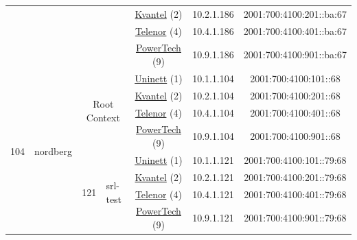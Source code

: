 \begin{small}
\begin{center}
\begin{longtable}{|c|c|c|c|c|c|c|c|}
  &  &  &  & \multicolumn{2}{|c|}{\tiny{\href{http://kvantel.no}{Kvantel} (2)}} & \tiny{10.2.1.186} & \tiny{2001:700:4100:201::ba:67} \\* \cline{5-5}\cline{6-6}\cline{7-7}\cline{8-8}
  &  &  &  & \multicolumn{2}{|c|}{\tiny{\href{https://www.telenor.no}{Telenor} (4)}} & \tiny{10.4.1.186} & \tiny{2001:700:4100:401::ba:67} \\* \cline{5-5}\cline{6-6}\cline{7-7}\cline{8-8}
  &  &  &  & \multicolumn{2}{|c|}{\tiny{\href{http://www.powertech.no}{PowerTech} (9)}} & \tiny{10.9.1.186} & \tiny{2001:700:4100:901::ba:67} \\ \hline
 \multirow{36}{*}{\tiny{104}} & \multicolumn{1}{|l|}{\multirow{36}{*}{\tiny{nordberg}}} & \multicolumn{2}{|c|}{\multirow{4}{*}{\tiny{Root Context}}} & \multicolumn{2}{|c|}{\tiny{\href{https://www.uninett.no}{Uninett} (1)}} & \tiny{10.1.1.104} & \tiny{2001:700:4100:101::68} \\* \cline{5-5}\cline{6-6}\cline{7-7}\cline{8-8}
  &  & \multicolumn{2}{|c|}{} & \multicolumn{2}{|c|}{\tiny{\href{http://kvantel.no}{Kvantel} (2)}} & \tiny{10.2.1.104} & \tiny{2001:700:4100:201::68} \\* \cline{5-5}\cline{6-6}\cline{7-7}\cline{8-8}
  &  & \multicolumn{2}{|c|}{} & \multicolumn{2}{|c|}{\tiny{\href{https://www.telenor.no}{Telenor} (4)}} & \tiny{10.4.1.104} & \tiny{2001:700:4100:401::68} \\* \cline{5-5}\cline{6-6}\cline{7-7}\cline{8-8}
  &  & \multicolumn{2}{|c|}{} & \multicolumn{2}{|c|}{\tiny{\href{http://www.powertech.no}{PowerTech} (9)}} & \tiny{10.9.1.104} & \tiny{2001:700:4100:901::68} \\* \cline{3-3}\cline{4-4}\cline{5-5}\cline{6-6}\cline{7-7}\cline{8-8}
  &  & \multirow{4}{*}{\tiny{121}} & \multicolumn{1}{|l|}{\multirow{4}{*}{\tiny{srl-test}}} & \multicolumn{2}{|c|}{\tiny{\href{https://www.uninett.no}{Uninett} (1)}} & \tiny{10.1.1.121} & \tiny{2001:700:4100:101::79:68} \\* \cline{5-5}\cline{6-6}\cline{7-7}\cline{8-8}
  &  &  &  & \multicolumn{2}{|c|}{\tiny{\href{http://kvantel.no}{Kvantel} (2)}} & \tiny{10.2.1.121} & \tiny{2001:700:4100:201::79:68} \\* \cline{5-5}\cline{6-6}\cline{7-7}\cline{8-8}
  &  &  &  & \multicolumn{2}{|c|}{\tiny{\href{https://www.telenor.no}{Telenor} (4)}} & \tiny{10.4.1.121} & \tiny{2001:700:4100:401::79:68} \\* \cline{5-5}\cline{6-6}\cline{7-7}\cline{8-8}
  &  &  &  & \multicolumn{2}{|c|}{\tiny{\href{http://www.powertech.no}{PowerTech} (9)}} & \tiny{10.9.1.121} & \tiny{2001:700:4100:901::79:68} \\* \cline{3-3}\cline{4-4}\cline{5-5}\cline{6-6}\cline{7-7}\cline{8-8}

\end{longtable}
\end{center}
\end{small}
